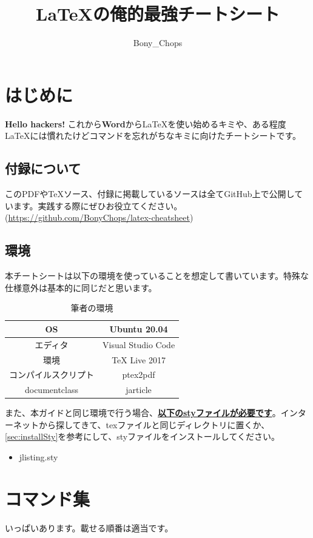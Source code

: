 \documentclass[a4j, titlepage]{jarticle}
\title{\LaTeX の俺的最強チートシート}
\author{Bony\_Chops}
\begin{document}
\maketitle
\setcounter{section}{-1}
\section{はじめに}
\textbf{Hello hackers!} これから\textbf{Word}から\LaTeX を使い始めるキミや、ある程度\LaTeX には慣れたけどコマンドを忘れがちなキミに向けたチートシートです。
\subsection{付録について}
このPDFや\TeX ソース、付録に掲載しているソースは全てGitHub上で公開しています。実践する際にぜひお役立てください。\\
(\url{https://github.com/BonyChops/latex-cheatsheet})
\subsection{環境}
本チートシートは以下の環境を使っていることを想定して書いています。特殊な仕様意外は基本的に同じだと思います。

\begin{table}[htbp]
    \center
    \caption{筆者の環境}
    \begin{tabular}{|c|c|} \hline
        OS & Ubuntu 20.04 \\ \hline
        エディタ & Visual Studio Code \\ \hline
        環境 & TeX Live 2017 \\ \hline
        コンパイルスクリプト & ptex2pdf \\ \hline
        documentclass & jarticle \\ \hline
    \end{tabular}
\end{table}

また、本ガイドと同じ環境で行う場合、\textbf{\underline{以下のstyファイルが必要です}}。インターネットから探してきて、texファイルと同じディレクトリに置くか、\ref{sec:installSty}を参考にして、styファイルをインストールしてください。
\begin{itemize}
    \item jlisting.sty
\end{itemize}

\newpage

\section{コマンド集}
いっぱいあります。載せる順番は適当です。
\end{document}
